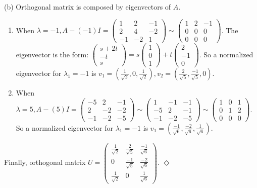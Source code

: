 \documentclass[12pt]{article}
\newcommand{\esolution}{\hfill $\Diamond$ \\ \vspace{.3cm}}
\begin{document}
(b) Orthogonal matrix is composed by eigenvectors of $A$.
\begin{enumerate}
	\item When $\lambda=-1, A-(-1)I=
	\begin{pmatrix}
		1 & 2 & -1 \\
		2 & 4 & -2 \\
		-1 & -2 & 1
	\end{pmatrix}\sim
	\begin{pmatrix}
		1 & 2 & -1 \\
		0 & 0 & 0 \\
		0 & 0 & 0
	\end{pmatrix}$. The eigenvector is the form: 
	$\begin{pmatrix}
		s+2t \\
		-t \\
		s
	\end{pmatrix}= s
	\begin{pmatrix}
		1 \\
		0 \\
		1
	\end{pmatrix} + t 
	\begin{pmatrix}
		2 \\
		-1 \\
		0
	\end{pmatrix}$. So a normalized eigenvector for $\lambda _1=-1$ is 
	$v_1=(\frac{1}{\sqrt{2}}, 0, \frac{1}{\sqrt{2}}), v_2=(\frac{2}{\sqrt{5}}, \frac{-1}{\sqrt{5}}, 0)$.
	\item When $\lambda=5, A-(5)I=
	\begin{pmatrix}
		-5 & 2 & -1 \\
		2 & -2 & -2 \\
		-1 & -2 & -5
	\end{pmatrix}\sim
	\begin{pmatrix}
		1 & -1 & -1 \\
		-5 & 2 & -1 \\
		-1 & -2 & -5
	\end{pmatrix}\sim
	\begin{pmatrix}
		1 & 0 & 1 \\
		0 & 1 & 2 \\
		0 & 0 & 0
	\end{pmatrix}$. So a normalized eigenvector for $\lambda _1=-1$ is 
	$v_1=(\frac{-1}{\sqrt{6}}, \frac{-2}{\sqrt{6}}, \frac{1}{\sqrt{6}})$.
\end{enumerate}
\qquad\quad Finally, orthogonal matrix $U=
	\begin{pmatrix}
		\frac{1}{\sqrt{2}} & \frac{2}{\sqrt{5}} & \frac{-1}{\sqrt{6}} \\[0.4em]
		0 & \frac{-1}{\sqrt{5}} & \frac{-2}{\sqrt{6}} \\[0.4em]
		\frac{1}{\sqrt{2}} & 0 & \frac{1}{\sqrt{6}}
	\end{pmatrix}$.
\esolution
\end{document}
